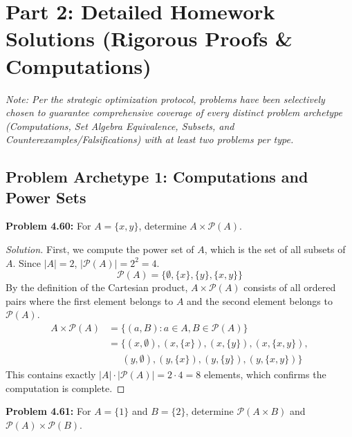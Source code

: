 \documentclass[12pt]{article}
\theoremstyle{definition}
\theoremstyle{remark}
\begin{document}
\newpage
\section{Part 2: Detailed Homework Solutions (Rigorous Proofs \& Computations)}

\textit{Note: Per the strategic optimization protocol, problems have been selectively chosen to guarantee comprehensive coverage of every distinct problem archetype (Computations, Set Algebra Equivalence, Subsets, and Counterexamples/Falsifications) with at least two problems per type.}

\subsection{Problem Archetype 1: Computations and Power Sets}

\textbf{Problem 4.60:} For $A = \{x, y\}$, determine $A \times \mathcal{P}(A)$.

\begin{proof}[Solution]
First, we compute the power set of $A$, which is the set of all subsets of $A$.
Since $|A| = 2$, $|\mathcal{P}(A)| = 2^2 = 4$.
\[ \mathcal{P}(A) = \{\emptyset, \{x\}, \{y\}, \{x, y\}\} \]
By the definition of the Cartesian product, $A \times \mathcal{P}(A)$ consists of all ordered pairs where the first element belongs to $A$ and the second element belongs to $\mathcal{P}(A)$.
\begin{align*}
A \times \mathcal{P}(A) &= \{ (a, B) : a \in A, B \in \mathcal{P}(A) \} \\
&= \{ (x, \emptyset), (x, \{x\}), (x, \{y\}), (x, \{x, y\}), \\
&\quad \ \ (y, \emptyset), (y, \{x\}), (y, \{y\}), (y, \{x, y\}) \}
\end{align*}
This contains exactly $|A| \cdot |\mathcal{P}(A)| = 2 \cdot 4 = 8$ elements, which confirms the computation is complete.
\end{proof}

\vspace{0.5cm}

\textbf{Problem 4.61:} For $A = \{1\}$ and $B = \{2\}$, determine $\mathcal{P}(A \times B)$ and $\mathcal{P}(A) \times \mathcal{P}(B)$.
\end{document}
